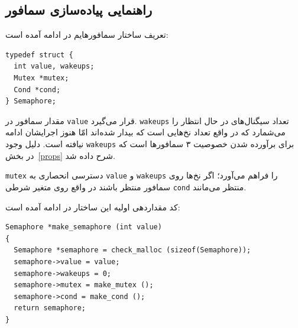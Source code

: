 \documentclass{book}
\newcommand{\clearemptydoublepage}{\newpage\cleardoublepage}
\begin{document}
\subsection{راهنمایی پیاده‌سازی سمافور}

     تعریف ساختار سمافورهایم در ادامه آمده است:

\begin{latin}
\begin{lstlisting}
typedef struct {
  int value, wakeups;
  Mutex *mutex;
  Cond *cond;
} Semaphore;
\end{lstlisting}
\end{latin}

    مقدار سمافور در {\tt value} قرار می‌گیرد.  {\tt wakeups} تعداد سیگنال‌های در حال انتظار را می‌شمارد که در واقع تعداد نخ‌هایی است که 
    بیدار شده‌اند امّا هنوز اجرایشان ادامه نیافته است. دلیل وجود {\tt wakeups} برای برآورده شدن خصوصیت ۳ سمافورها است که در بخش~\ref{props} 
    شرح داده شد. 
    

    {\tt mutex} 
    دسترسی انحصاری به  {\tt value} و {\tt wakeups} را فراهم می‌آورد؛ 
     اگر  نخ‌ها روی سمافور منتظر باشند در واقع روی متغیر شرطی   {\tt cond}  منتظر می‌مانند. 

    کد مقداردهی اولیه این ساختار در ادامه آمده است:

\begin{latin}
\begin{lstlisting}
Semaphore *make_semaphore (int value)
{
  Semaphore *semaphore = check_malloc (sizeof(Semaphore));
  semaphore->value = value;
  semaphore->wakeups = 0;
  semaphore->mutex = make_mutex ();
  semaphore->cond = make_cond ();
  return semaphore;
}
\end{lstlisting}
\end{latin}


\clearemptydoublepage
\end{document}
